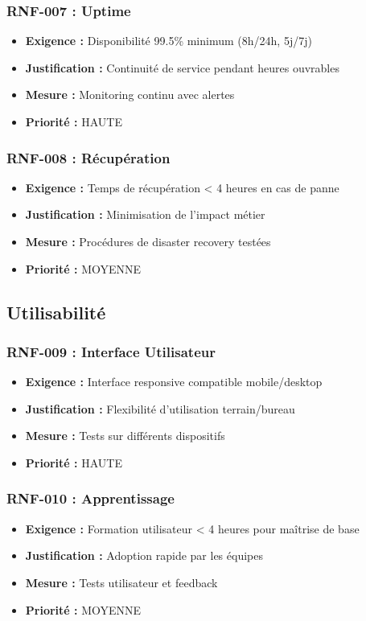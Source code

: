 \subsubsection{RNF-007 : Uptime}
\begin{itemize}
    \item \textbf{Exigence :} Disponibilité 99.5\% minimum (8h/24h, 5j/7j)
    \item \textbf{Justification :} Continuité de service pendant heures ouvrables
    \item \textbf{Mesure :} Monitoring continu avec alertes
    \item \textbf{Priorité :} HAUTE
\end{itemize}

\subsubsection{RNF-008 : Récupération}
\begin{itemize}
    \item \textbf{Exigence :} Temps de récupération < 4 heures en cas de panne
    \item \textbf{Justification :} Minimisation de l'impact métier
    \item \textbf{Mesure :} Procédures de disaster recovery testées
    \item \textbf{Priorité :} MOYENNE
\end{itemize}

\subsection{Utilisabilité}

\subsubsection{RNF-009 : Interface Utilisateur}
\begin{itemize}
    \item \textbf{Exigence :} Interface responsive compatible mobile/desktop
    \item \textbf{Justification :} Flexibilité d'utilisation terrain/bureau
    \item \textbf{Mesure :} Tests sur différents dispositifs
    \item \textbf{Priorité :} HAUTE
\end{itemize}

\subsubsection{RNF-010 : Apprentissage}
\begin{itemize}
    \item \textbf{Exigence :} Formation utilisateur < 4 heures pour maîtrise de base
    \item \textbf{Justification :} Adoption rapide par les équipes
    \item \textbf{Mesure :} Tests utilisateur et feedback
    \item \textbf{Priorité :} MOYENNE
\end{itemize}

